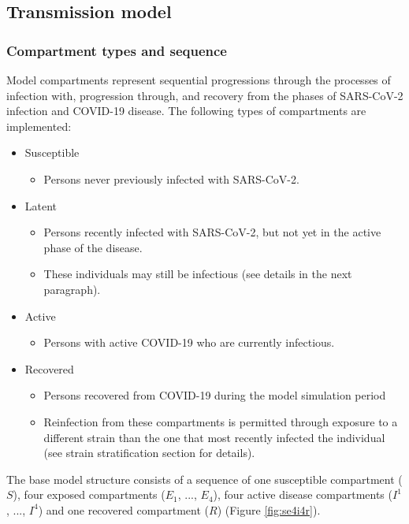 \subsection{Transmission model}
\label{trans} 
\subsubsection{Compartment types and sequence}
\label{model_structure}
Model compartments represent sequential progressions through the processes of 
infection with, progression through, and recovery from the phases of SARS-CoV-2
infection and COVID-19 disease. The following types of compartments are implemented:
\begin{itemize}
    \item Susceptible
    \begin{itemize}
        \item Persons never previously infected with SARS-CoV-2.
    \end{itemize}
    \item Latent
    \begin{itemize}
        \item Persons recently infected with SARS-CoV-2, but not yet in the active phase of the disease.
        \item These individuals may still be infectious (see details in the next paragraph).
    \end{itemize}
    \item Active
    \begin{itemize}
        \item Persons with active COVID-19 who are currently infectious.
    \end{itemize}
    \item Recovered
    \begin{itemize}
        \item Persons recovered from COVID-19 during the model simulation period       
        \item Reinfection from these compartments is permitted through exposure to a different
        strain than the one that most recently infected the individual (see strain stratification section for details).
    \end{itemize}
\end{itemize}
The base model structure consists of a sequence of one susceptible compartment ($S$), four exposed compartments ($E_1$, ..., $E_4$), four active disease compartments ($I^1$, ..., $I^4$) and one recovered compartment ($R$) (Figure \ref{fig:se4i4r}).

